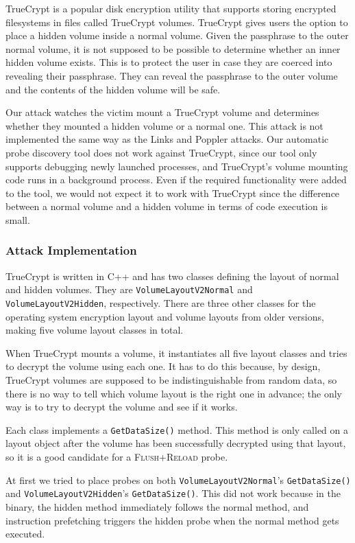 \documentclass[letterpaper,twocolumn,10pt]{article}
\begin{document}
TrueCrypt is a popular disk encryption utility that supports storing encrypted
filesystems in files called TrueCrypt volumes. TrueCrypt gives users the option
to place a hidden volume inside a normal volume. Given the passphrase to the
outer normal volume, it is not supposed to be possible to determine whether an
inner hidden volume exists. This is to protect the user in case they are coerced
into revealing their passphrase. They can reveal the passphrase to the outer
volume and the contents of the hidden volume will be safe. 

Our attack watches the victim mount a TrueCrypt volume and determines whether
they mounted a hidden volume or a normal one. This attack is not implemented the
same way as the Links and Poppler attacks. Our automatic probe discovery tool
does not work against TrueCrypt, since our tool only supports debugging newly
launched processes, and TrueCrypt's volume mounting code runs in a background
process. Even if the required functionality were added to the tool, we would not
expect it to work with TrueCrypt since the difference between a normal volume
and a hidden volume in terms of code execution is small.

\subsubsection{Attack Implementation}

TrueCrypt is written in C++ and has two classes defining the layout of normal
and hidden volumes. They are \texttt{VolumeLayout\-V2Normal} and
\texttt{VolumeLayout\-V2Hidden}, respectively. There are three other classes for
the operating system encryption layout and volume layouts from older versions,
making five volume layout classes in total.

When TrueCrypt mounts a volume, it instantiates all five layout classes and
tries to decrypt the volume using each one. It has to do this because, by
design, TrueCrypt volumes are supposed to be indistinguishable from random data,
so there is no way to tell which volume layout is the right one in advance; the
only way is to try to decrypt the volume and see if it works.

Each class implements a \texttt{GetDataSize()} method. This method is only
called on a layout object after the volume has been successfully decrypted using
that layout, so it is a good candidate for a \textsc{Flush+Reload} probe.

At first we tried to place probes on both \texttt{VolumeLayout\-V2Normal}'s
\texttt{GetDataSize()} and \texttt{VolumeLayout\-V2Hidden}'s
\texttt{GetDataSize()}. This did not work because in the binary, the hidden
method immediately follows the normal method, and instruction prefetching
triggers the hidden probe when the normal method gets executed.
\end{document}
